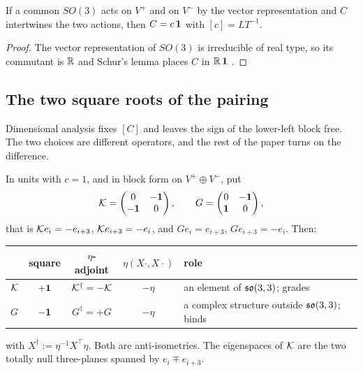 \begin{theorem}
\label{thm:onec}
If a common $SO(3)$ acts on $V^+$ and on $V^-$ by the vector representation and $C$ intertwines the two actions, then
$C=c\,\mathbf 1$ with $[c]=LT^{-1}$.
\end{theorem}

\begin{proof}
The vector representation of $SO(3)$ is irreducible of real type, so its commutant is $\mathbb{R}$ and Schur's lemma places $C$ in
$\mathbb{R}\,\mathbf 1$ \cite{GoodmanWallach}.
\end{proof}

\subsection{The two square roots of the pairing}

Dimensional analysis fixes $[C]$ and leaves the sign of the lower-left block free. The two choices are different operators,
and the rest of the paper turns on the difference.

\begin{proposition}
\label{prop:twoK}
In units with $c=1$, and in block form on $V^+\oplus V^-$, put
\[
\mathcal K=\begin{pmatrix}0&-\mathbf 1\\ -\mathbf 1&0\end{pmatrix},\qquad
G=\begin{pmatrix}0&-\mathbf 1\\ \mathbf 1&0\end{pmatrix},
\]
that is $\mathcal K e_i=-e_{i+3}$, $\mathcal K e_{i+3}=-e_i$, and $Ge_i=e_{i+3}$, $Ge_{i+3}=-e_i$. Then:
\begin{center}
\begin{tabular}{@{}lcccl@{}}
\toprule
& square & $\eta$-adjoint & $\eta(X\cdot,X\cdot)$ & role\\
\midrule
$\mathcal K$ & $+\mathbf 1$ & $\mathcal K^\dagger=-\mathcal K$ & $-\eta$ & an element of $\mathfrak{so}(3,3)$; grades\\
$G$ & $-\mathbf 1$ & $G^\dagger=+G$ & $-\eta$ & a complex structure outside $\mathfrak{so}(3,3)$; binds\\
\bottomrule
\end{tabular}
\end{center}
with $X^\dagger:=\eta^{-1}X^{\!\top}\eta$. Both are anti-isometries. The eigenspaces of $\mathcal K$ are the two totally null three-planes
spanned by $e_i\mp e_{i+3}$.
\end{proposition}

